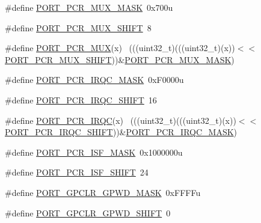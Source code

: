 \begin{DoxyCompactItemize}
\#define \hyperlink{group___p_o_r_t___register___masks_ga0feec5fc6b285b83c573f913c74e5c41}{P\+O\+R\+T\+\_\+\+P\+C\+R\+\_\+\+M\+U\+X\+\_\+\+M\+A\+SK}~0x700u
\item 
\#define \hyperlink{group___p_o_r_t___register___masks_gaa39e1cfed4df3797e4f1d141adab8776}{P\+O\+R\+T\+\_\+\+P\+C\+R\+\_\+\+M\+U\+X\+\_\+\+S\+H\+I\+FT}~8
\item 
\#define \hyperlink{group___p_o_r_t___register___masks_gad20ae957ec775096862e8a6542463e03}{P\+O\+R\+T\+\_\+\+P\+C\+R\+\_\+\+M\+UX}(x)                                                ~(((uint32\+\_\+t)(((uint32\+\_\+t)(x))$<$$<$\hyperlink{group___p_o_r_t___register___masks_gaa39e1cfed4df3797e4f1d141adab8776}{P\+O\+R\+T\+\_\+\+P\+C\+R\+\_\+\+M\+U\+X\+\_\+\+S\+H\+I\+FT}))\&\hyperlink{group___p_o_r_t___register___masks_ga0feec5fc6b285b83c573f913c74e5c41}{P\+O\+R\+T\+\_\+\+P\+C\+R\+\_\+\+M\+U\+X\+\_\+\+M\+A\+SK})
\item 
\#define \hyperlink{group___p_o_r_t___register___masks_gabaef70d886fda0a7da8e862308bf5909}{P\+O\+R\+T\+\_\+\+P\+C\+R\+\_\+\+I\+R\+Q\+C\+\_\+\+M\+A\+SK}~0x\+F0000u
\item 
\#define \hyperlink{group___p_o_r_t___register___masks_ga0bda43cd85ca4d5df17f12a193937d81}{P\+O\+R\+T\+\_\+\+P\+C\+R\+\_\+\+I\+R\+Q\+C\+\_\+\+S\+H\+I\+FT}~16
\item 
\#define \hyperlink{group___p_o_r_t___register___masks_gadbd5b173d13c0766ed34cb90095ba789}{P\+O\+R\+T\+\_\+\+P\+C\+R\+\_\+\+I\+R\+QC}(x)                                              ~(((uint32\+\_\+t)(((uint32\+\_\+t)(x))$<$$<$\hyperlink{group___p_o_r_t___register___masks_ga0bda43cd85ca4d5df17f12a193937d81}{P\+O\+R\+T\+\_\+\+P\+C\+R\+\_\+\+I\+R\+Q\+C\+\_\+\+S\+H\+I\+FT}))\&\hyperlink{group___p_o_r_t___register___masks_gabaef70d886fda0a7da8e862308bf5909}{P\+O\+R\+T\+\_\+\+P\+C\+R\+\_\+\+I\+R\+Q\+C\+\_\+\+M\+A\+SK})
\item 
\#define \hyperlink{group___p_o_r_t___register___masks_ga154d9308c2ab5b6a78ab04d9f3b08879}{P\+O\+R\+T\+\_\+\+P\+C\+R\+\_\+\+I\+S\+F\+\_\+\+M\+A\+SK}~0x1000000u
\item 
\#define \hyperlink{group___p_o_r_t___register___masks_ga5fbf95753704fb1d71da88299c11105e}{P\+O\+R\+T\+\_\+\+P\+C\+R\+\_\+\+I\+S\+F\+\_\+\+S\+H\+I\+FT}~24
\item 
\#define \hyperlink{group___p_o_r_t___register___masks_gaa7e4a890e9d09d85279889ce3ecb0044}{P\+O\+R\+T\+\_\+\+G\+P\+C\+L\+R\+\_\+\+G\+P\+W\+D\+\_\+\+M\+A\+SK}~0x\+F\+F\+F\+Fu
\item 
\#define \hyperlink{group___p_o_r_t___register___masks_gaafacaac0aa215f596b947609857d6491}{P\+O\+R\+T\+\_\+\+G\+P\+C\+L\+R\+\_\+\+G\+P\+W\+D\+\_\+\+S\+H\+I\+FT}~0

\end{DoxyCompactItemize}
